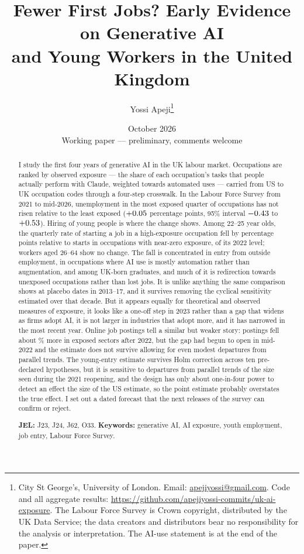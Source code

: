 \documentclass[11pt]{article}
\title{Fewer First Jobs? Early Evidence on Generative AI\\ and Young Workers in the United Kingdom}
\author{Yossi Apeji\thanks{City St George's, University of London. Email: \href{mailto:apejiyossi@gmail.com}{apejiyossi@gmail.com}. Code and all aggregate results: \url{https://github.com/apejiyossi-commits/uk-ai-exposure}. The Labour Force Survey is Crown copyright, distributed by the UK Data Service; the data creators and distributors bear no responsibility for the analysis or interpretation. The AI-use statement is at the end of the paper.}}
\date{October 2026 \\[0.5em] \small Working paper --- preliminary, comments welcome}
\begin{document}
\maketitle

\begin{abstract}
\noindent
I study the first four years of generative AI in the UK labour market. Occupations are ranked by observed exposure --- the share of each occupation's tasks that people actually perform with Claude, weighted towards automated uses \citep{massenkoff2026} --- carried from US to UK occupation codes through a four-step crosswalk. In the Labour Force Survey from 2021 to mid-2026, unemployment in the most exposed quarter of occupations has not risen relative to the least exposed ($+0.05$ percentage points, 95\% interval $-0.43$ to $+0.53$). Hiring of young people is where the change shows. Among 22--25 year olds, the quarterly rate of starting a job in a high-exposure occupation fell by \entryEstAbs{} percentage points relative to starts in occupations with near-zero exposure, \entryPctAbs{} of its 2022 level; workers aged 26--64 show no change. The fall is concentrated in entry from outside employment, in occupations where AI use is mostly automation rather than augmentation, and among UK-born graduates, and much of it is redirection towards unexposed occupations rather than lost jobs. It is unlike anything the same comparison shows at placebo dates in 2013--17, and it survives removing the cyclical sensitivity estimated over that decade. But it appears equally for theoretical and observed measures of exposure, it looks like a one-off step in 2023 rather than a gap that widens as firms adopt AI, it is not larger in industries that adopt more, and it has narrowed in the most recent year. Online job postings tell a similar but weaker story: postings fell about \postRawAbs\% more in exposed sectors after 2022, but the gap had begun to open in mid-2022 and the estimate does not survive allowing for even modest departures from parallel trends. The young-entry estimate survives Holm correction across ten pre-declared hypotheses, but it is sensitive to departures from parallel trends of the size seen during the 2021 reopening, and the design has only about one-in-four power to detect an effect the size of the US estimate, so the point estimate probably overstates the true effect. I set out a dated forecast that the next releases of the survey can confirm or reject.

\medskip
\noindent\textbf{JEL:} J23, J24, J62, O33. \quad \textbf{Keywords:} generative AI, AI exposure, youth employment, job entry, Labour Force Survey.
\end{abstract}
\end{document}
